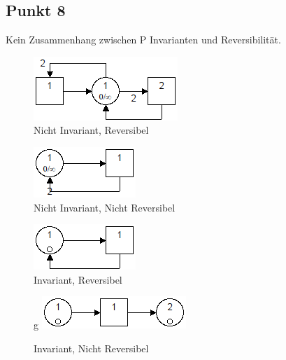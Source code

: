 \documentclass[10pt]{scrartcl}
\begin{document}
		\subsection{Punkt 8}
		Kein Zusammenhang zwischen P Invarianten und Reversibilität.
				\begin{figure}[H]
    				\centering	
					\includegraphics[scale=0.5]{aufg081.png}		
            		\caption{Nicht Invariant, Reversibel}
				\end{figure}
				\begin{figure}[H]
    				\centering	
					\includegraphics[scale=0.5]{aufg082.png}		
            		\caption{Nicht Invariant, Nicht Reversibel}
				\end{figure}
				\begin{figure}[H]
    				\centering	
					\includegraphics[scale=0.5]{aufg083.png}		
            		\caption{Invariant, Reversibel}
				\end{figure}
				\begin{figure}[H]
    				\centerin g	
					\includegraphics[scale=0.5]{aufg084.png}		
            		\caption{Invariant, Nicht Reversibel}
				\end{figure}
					
\end{document}
